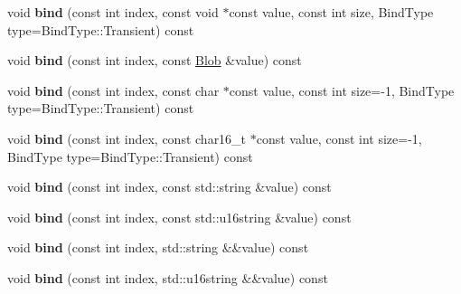 \begin{DoxyCompactItemize}
\item 
\hypertarget{class_s_q_lite_1_1_statement_aab00e4b2d9a0d85ccaf2b058d0cc9523}{void {\bfseries bind} (const int index, const void $\ast$const value, const int size, Bind\-Type type=Bind\-Type\-::\-Transient) const }\label{class_s_q_lite_1_1_statement_aab00e4b2d9a0d85ccaf2b058d0cc9523}

\item 
\hypertarget{class_s_q_lite_1_1_statement_afc5e0d9485bfedc71e9863cdb3c3d11a}{void {\bfseries bind} (const int index, const \hyperlink{class_s_q_lite_1_1_blob}{Blob} \&value) const }\label{class_s_q_lite_1_1_statement_afc5e0d9485bfedc71e9863cdb3c3d11a}

\item 
\hypertarget{class_s_q_lite_1_1_statement_a3ed628586d99205a1443790e7dc1e36f}{void {\bfseries bind} (const int index, const char $\ast$const value, const int size=-\/1, Bind\-Type type=Bind\-Type\-::\-Transient) const }\label{class_s_q_lite_1_1_statement_a3ed628586d99205a1443790e7dc1e36f}

\item 
\hypertarget{class_s_q_lite_1_1_statement_a6b983503e072b56f2255b140dd271381}{void {\bfseries bind} (const int index, const char16\-\_\-t $\ast$const value, const int size=-\/1, Bind\-Type type=Bind\-Type\-::\-Transient) const }\label{class_s_q_lite_1_1_statement_a6b983503e072b56f2255b140dd271381}

\item 
\hypertarget{class_s_q_lite_1_1_statement_a2e33406ed4170291b9e3da490383a224}{void {\bfseries bind} (const int index, const std\-::string \&value) const }\label{class_s_q_lite_1_1_statement_a2e33406ed4170291b9e3da490383a224}

\item 
\hypertarget{class_s_q_lite_1_1_statement_a0a2d97dc865a1ebefb58f982fe5689a0}{void {\bfseries bind} (const int index, const std\-::u16string \&value) const }\label{class_s_q_lite_1_1_statement_a0a2d97dc865a1ebefb58f982fe5689a0}

\item 
\hypertarget{class_s_q_lite_1_1_statement_aa78aca5ae5830111b4097de1596c5eb0}{void {\bfseries bind} (const int index, std\-::string \&\&value) const }\label{class_s_q_lite_1_1_statement_aa78aca5ae5830111b4097de1596c5eb0}

\item 
\hypertarget{class_s_q_lite_1_1_statement_a0bf4a9fe041c5a95c099d8fd1e085ecd}{void {\bfseries bind} (const int index, std\-::u16string \&\&value) const }\label{class_s_q_lite_1_1_statement_a0bf4a9fe041c5a95c099d8fd1e085ecd}


\end{DoxyCompactItemize}
